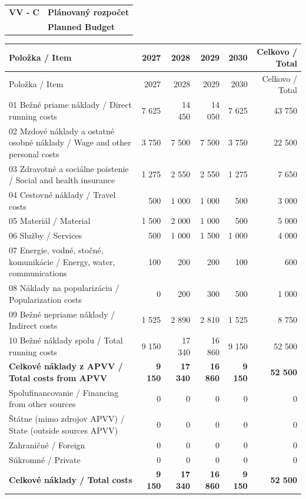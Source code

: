 \documentclass[9pt,a4paper]{extarticle}
\newcommand{\SecHead}[3]{\par\needspace{45pt}\vspace{7pt}\noindent
\begin{tabularx}{\textwidth}{|>{\bfseries\centering\arraybackslash}p{18mm}|X|}
\hline\cellcolor{shade}#1 & \cellcolor{shade}\hfill\bfseries #2 \\ \cellcolor{shade} & \cellcolor{shade}\hfill\bfseries #3 \\ \hline
\end{tabularx}\vspace{3pt}\par}
\begin{document}
\SecHead{VV - C}{Plánovaný rozpočet}{Planned Budget}
\small
\begin{longtable}{|p{74mm}|r|r|r|r|r|}
\hline\rowcolor{shade} Položka / Item & 2027 & 2028 & 2029 & 2030 & Celkovo / Total\\\hline\endfirsthead
\hline\rowcolor{shade} Položka / Item & 2027 & 2028 & 2029 & 2030 & Celkovo / Total\\\hline\endhead
01 Bežné priame náklady /  Direct running costs & 7 625 & 14 450 & 14 050 & 7 625 & 43 750\\\hline
02 Mzdové náklady a ostatné osobné náklady / Wage and other personal costs & 3 750 & 7 500 & 7 500 & 3 750 & 22 500\\\hline
03 Zdravotné a sociálne poistenie / Social and health insurance & 1 275 & 2 550 & 2 550 & 1 275 & 7 650\\\hline
04 Cestovné náklady / Travel costs & 500 & 1 000 & 1 000 & 500 & 3 000\\\hline
05 Materiál / Material & 1 500 & 2 000 & 1 000 & 500 & 5 000\\\hline
06 Služby / Services & 500 & 1 000 & 1 500 & 1 000 & 4 000\\\hline
07 Energie, vodné, stočné, komunikácie / Energy, water, communications & 100 & 200 & 200 & 100 & 600\\\hline
08 Náklady na popularizáciu / Popularization costs& 0 & 200 & 300 & 500 & 1 000\\\hline
09 Bežné nepriame náklady / Indirect costs & 1 525 & 2 890 & 2 810 & 1 525 & 8 750\\\hline
10 Bežné náklady spolu / Total running costs & 9 150 & 17 340 & 16 860 & 9 150 & 52 500\\\hline
\rowcolor{shade}\textbf{Celkové náklady z APVV /
Total costs from APVV} & \textbf{9 150} & \textbf{17 340} & \textbf{16 860} & \textbf{9 150} & \textbf{52 500}\\\hline
Spolufinancovanie / Financing from other sources & 0 & 0 & 0 & 0 & 0\\\hline
\quad Štátne (mimo zdrojov APVV) / State (outside sources APVV) & 0 & 0 & 0 & 0 & 0\\\hline
\quad Zahraničné / Foreign & 0 & 0 & 0 & 0 & 0\\\hline
\quad Súkromné / Private & 0 & 0 & 0 & 0 & 0\\\hline
\rowcolor{shade}\textbf{Celkové náklady / Total costs} & \textbf{9 150} & \textbf{17 340} & \textbf{16 860} & \textbf{9 150} & \textbf{52 500}\\\hline
\end{longtable}\normalsize
\end{document}

